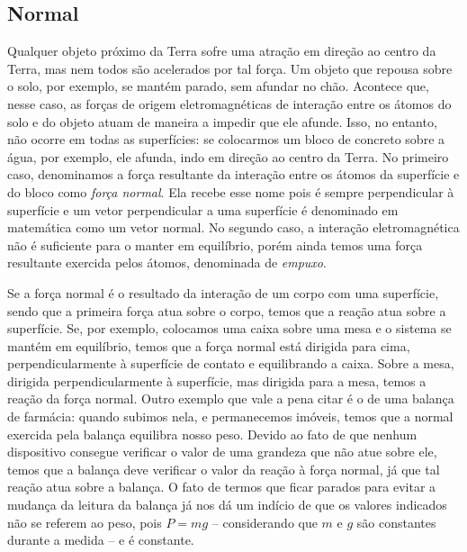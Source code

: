 \subsection{Normal} 

Qualquer objeto próximo da Terra sofre uma atração em direção ao centro da Terra, mas nem todos são acelerados por tal força. Um objeto que repousa sobre o solo, por exemplo, se mantém parado, sem afundar no chão. Acontece que, nesse caso, as forças de origem eletromagnéticas de interação entre os átomos do solo e do objeto atuam de maneira a impedir que ele afunde. Isso, no entanto, não ocorre em todas as superfícies: se colocarmos um bloco de concreto sobre a água, por exemplo, ele afunda, indo em direção ao centro da Terra. No primeiro caso, denominamos a força resultante da interação entre os átomos da superfície e do bloco como \emph{força normal}. Ela recebe esse nome pois é sempre perpendicular à superfície e um vetor perpendicular a uma superfície é denominado em matemática como um vetor normal. No segundo caso, a interação eletromagnética não é suficiente para o manter em equilíbrio, porém ainda temos uma força resultante exercida pelos átomos, denominada de \emph{empuxo}.

Se a força normal é o resultado da interação de um corpo com uma superfície, sendo que a primeira força atua sobre o corpo, temos que a reação atua sobre a superfície. Se, por exemplo, colocamos uma caixa sobre uma mesa e o sistema se mantém em equilíbrio, temos que a força normal está dirigida para cima, perpendicularmente à superfície de contato e equilibrando a caixa. Sobre a mesa, dirigida perpendicularmente à superfície, mas dirigida para a mesa, temos a reação da força normal. Outro exemplo que vale a pena citar é o de uma balança de farmácia: quando subimos nela, e permanecemos imóveis, temos que a normal exercida pela balança equilibra nosso peso.  Devido ao fato de que nenhum dispositivo consegue verificar o valor de uma grandeza que não atue sobre ele, temos que a balança deve verificar o valor da reação à força normal, já que tal reação atua sobre a balança. O fato de termos que ficar parados para evitar a mudança da leitura da balança já nos dá um indício de que os valores indicados não se referem ao peso, pois $P = mg$ -- considerando que $m$ e $g$ são constantes durante a medida -- e é constante.

